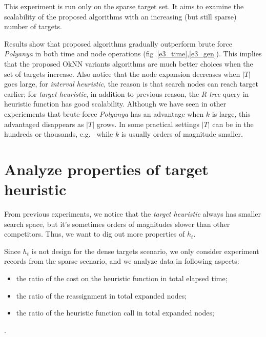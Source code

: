 This experiment is run only on the sparse target set. It aims to examine the scalability of the proposed algorithms with an increasing
(but still sparse) number of targets.

Results show that proposed algorithms gradually outperform brute force \textit{Polyanya} in both time and node operations (fig~\ref{e3_time},\ref{e3_gen}).
This implies that the proposed OkNN variants algorithms are much better choices when the set of targets increase. 
Also notice that the node expansion decreases when $|T|$ goes large,
for \textit{interval heuristic}, the reason is that search nodes can reach target earlier; for
\textit{target heuristic}, in addition to previous reason, the \textit{R-tree} query in
heuristic function has good scalability. 
Although we have seen in other experiements that brute-force \textit{Polyanya} has an advantage when $k$ is large, this advantaged disappears as $|T|$ grows.
In some practical settings $|T|$ can be in the hundreds or thousands, e.g.~\cite{abeywickrama2016k} while $k$ is usually orders of magnitude smaller. 

\section{Analyze properties of target heuristic}\label{exp4}
From previous experiments, we notice that the \textit{target heuristic} always has smaller search space,
but it's sometimes orders of magnitudes slower than other competitors.
Thus, we want to dig out more properties of $h_t$.

Since $h_t$ is not design for the dense targets scenario,
we only consider experiment records from the sparse scenario,
and we analyze data in following aspects:
\begin{itemize}
  \item the ratio of the cost on the heuristic function in total elapsed time;
  \item the ratio of the reassignment in total expanded nodes;
  \item the ratio of the heuristic function call in total expanded nodes;
\end{itemize}.

